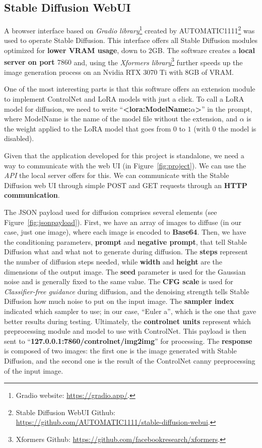 \documentclass[preprint]{elsarticle}
\begin{document}
\subsection{Stable Diffusion WebUI} \label{sec:stable_diffusion_webui}

A browser interface based on \emph{Gradio library}\footnote{Gradio website: \url{https://gradio.app/}.} 
created by AUTOMATIC1111\footnote{Stable Diffusion WebUI Github: \url{https://github.com/AUTOMATIC1111/stable-diffusion-webui}.} 
was used to operate Stable Diffusion. 
This interface offers all Stable Diffusion modules optimized for \textbf{lower VRAM usage}, down to 2GB. 
The software creates a \textbf{local server on port $7860$} and,  using the \emph{Xformers library}\footnote{Xformers Github: \url{https://github.com/facebookresearch/xformers}.} further speeds up the image generation process on an Nvidia RTX 3070 Ti with 8GB of VRAM.

One of the most interesting parts is that this software offers an extension module to  implement ControlNet and LoRA models with just a click.  To call a LoRA model for diffusion, we need to write ``\textbf{<lora:ModelName:$\alpha$>}'' in the prompt,
where ModelName is the name of the model file without the extension,  and $\alpha$ is the weight applied to the LoRA model that goes from $0$ to $1$ (with $0$ the model is disabled). 

Given that the application developed for this project is standalone,  we need a way to communicate with the web UI (in Figure~\ref{fig:project}). We can use the \emph{API} the local server offers for this.
We can communicate with the Stable Diffusion web UI through simple 
POST and GET requests through an \textbf{HTTP communication}. 



The JSON payload used for diffusion comprises several elements (see Figure~\ref{fig:jsonpayload}).
First, we have an array of images to diffuse (in our case, just one image), 
where each image is encoded to \textbf{Base64}. 
Then, we have the conditioning parameters, \textbf{prompt} and \textbf{negative prompt}, 
that tell Stable Diffusion what and what not to generate during diffusion. 
The \textbf{steps} represent the number of diffusion steps needed, while \textbf{width} 
and \textbf{height} are the dimensions of the output image. 
The \textbf{seed} parameter is used for the Gaussian noise and is generally fixed to the same value. 
The \textbf{CFG scale} is used for \emph{Classifier-free guidance} during diffusion, 
and the denoising strength tells Stable Diffusion how much noise to put on the input image. 
The \textbf{sampler index} indicated which sampler to use; in our case, ``Euler a'', 
which is the one that gave better results during testing.
Ultimately, the \textbf{controlnet units} represent which preprocessing module and model to use with ControlNet.
This payload is then sent to ``\textbf{127.0.0.1:7860/controlnet/img2img}'' for processing. 
The \textbf{response} is composed of two images: the first one is the image generated with Stable Diffusion, 
and the second one is the result of the ControlNet canny preprocessing of the input image.
\end{document}
